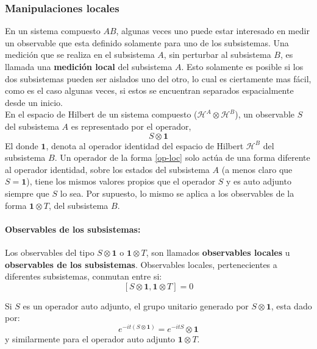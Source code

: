 \documentclass[12pt]{book}
\numberwithin{equation}{chapter}
\def\H{\mathcal{H}}
\def\pr{\otimes}
\def\1{\mathbf{1}}
\begin{document}
\subsubsection{Manipulaciones locales}
En un sistema compuesto $AB$, algunas veces uno puede estar interesado en medir un observable que esta definido solamente para uno de los subsistemas. Una medici\'on que se realiza en el subsistema $A$, sin perturbar al subsistema $B$, es llamada una {\bf medici\'on local} del subsistema $A$. Esto solamente es posible si los dos subsistemas pueden ser aislados uno del otro, lo cual es ciertamente mas f\'acil, como es el caso algunas veces, si estos se encuentran separados espacialmente desde un inicio.\\

En el espacio de Hilbert de un sistema compuesto ($\H^{A} \pr \H^{B}$), un observable $S$ del subsistema $A$ es representado por el operador,
\begin{equation}\label{op-loc}
S \pr \1
\end{equation}
El donde $\1$, denota al operador identidad del espacio de Hilbert $\H^{B}$ del subsistema $B$. Un operador de la forma \eqref{op-loc} solo act\'ua de una forma diferente al operador identidad, sobre los estados del subsistema $A$ (a menos claro que $S= \1$), tiene los mismos valores propios que el operador $S$ y es auto adjunto siempre que $S$ lo sea. Por supuesto, lo mismo se aplica a los observables de la forma $\1 \pr T$, del subsistema $B$.

\paragraph{Observables de los subsistemas:}
Los observables del tipo $S \pr \1$ o $ \1 \pr T $, son llamados {\bf observables locales} u {\bf observables de los subsistemas}. Observables locales, pertenecientes a diferentes subsistemas, conmutan entre si: 
$$ [ S \pr \1 , \1 \pr T ]=0 $$   

Si $S$ es un operador auto adjunto, el grupo unitario generado por $S \pr \1$, esta dado por:
\begin{equation}
e^{ -it (S \pr \1) }= e^{-itS} \pr \1
\end{equation}
y similarmente para el operador auto adjunto $\1 \pr T$.

\rightline{$\dag$}
\vspace{5 mm}
\end{document}
